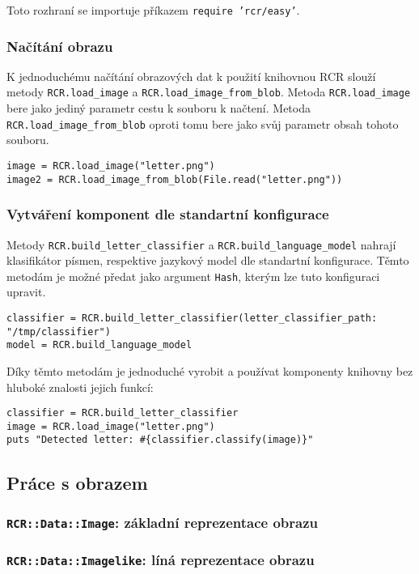 \documentclass[a4paper]{article}
\begin{document}
Toto rozhraní se importuje příkazem \texttt{require 'rcr/easy'}.

\subsubsection{Načítání obrazu}
K jednoduchému načítání obrazových dat k použití knihovnou RCR slouží metody
\texttt{RCR.load\_image} a \texttt{RCR.load\_image\_from\_blob}. Metoda
\texttt{RCR.load\_image} bere jako jediný parametr cestu k souboru k načtení.
Metoda \texttt{RCR.load\_image\_from\_blob} oproti tomu bere jako svůj parametr
obsah tohoto souboru.
\begin{lstlisting}
image = RCR.load_image("letter.png")
image2 = RCR.load_image_from_blob(File.read("letter.png"))
\end{lstlisting}

\subsubsection{Vytváření komponent dle standartní konfigurace}
Metody \texttt{RCR.build\_letter\_classifier} a
\texttt{RCR.build\_language\_model} nahrají klasifikátor písmen, respektive jazykový model
dle standartní konfigurace. Těmto metodám je možné předat jako argument
\texttt{Hash}, kterým lze tuto konfiguraci upravit.
\begin{lstlisting}
classifier = RCR.build_letter_classifier(letter_classifier_path: "/tmp/classifier")
model = RCR.build_language_model
\end{lstlisting}

Díky těmto metodám je jednoduché vyrobit a používat komponenty knihovny
bez hluboké znalosti jejich funkcí:
\begin{lstlisting}
classifier = RCR.build_letter_classifier
image = RCR.load_image("letter.png")
puts "Detected letter: #{classifier.classify(image)}"
\end{lstlisting}

\subsection{Práce s obrazem}
\subsubsection{\texttt{RCR::Data::Image}: základní reprezentace obrazu}
\subsubsection{\texttt{RCR::Data::Imagelike}: líná reprezentace obrazu}
\end{document}
